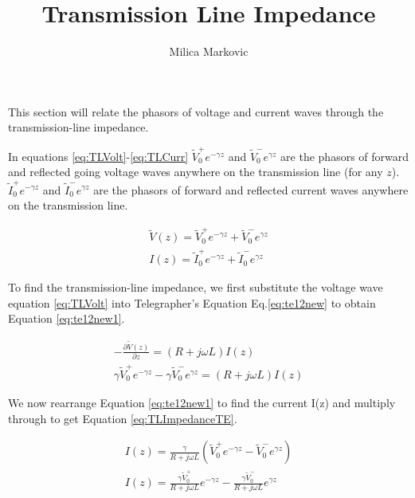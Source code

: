 \documentclass{ximera}
\title{Transmission Line Impedance}
\author{Milica Markovic}
\begin{document}
  
\begin{abstract}  

\end{abstract}  
\maketitle    






This section will relate the phasors of voltage and
current waves through the transmission-line impedance.





In equations \ref{eq:TLVolt}-\ref{eq:TLCurr} $\tilde{V}_0^+ e^{-\gamma z}$ and $\tilde{V}_0^- e^{\gamma z}$ are the phasors of forward and
reflected going voltage waves anywhere on the transmission line (for any $z$). $\tilde{I}_0^+ e^{-\gamma z}$ and $\tilde{I}_0^- e^{\gamma z}$ are the phasors of forward and
reflected current waves anywhere on the transmission line. 


\begin{eqnarray}
\tilde{V}(z)=\tilde{V}_0^+ e^{-\gamma z} + \tilde{V}_0^- e^{\gamma z}\label{eq:TLVolt} \\
I(z)=\tilde{I}_0^+ e^{-\gamma z} + \tilde{I}_0^- e^{\gamma z}\label{eq:TLCurr}
\end{eqnarray}




To find the transmission-line impedance, we first substitute the voltage wave equation \ref{eq:TLVolt} into Telegrapher's  Equation 
 Eq.\ref{eq:te12new}  to obtain Equation \ref{eq:te12new1}.




\begin{eqnarray}
-\frac{\partial \tilde{V}(z)}{\partial z} = (R+j\omega L) I(z) \label{eq:te12new} \\
\gamma \tilde{V}_0^+ e^{-\gamma z} - \gamma \tilde{V}_0^- e^{\gamma z} = (R+ j \omega
L) I(z) \label{eq:te12new1}
\end{eqnarray}

We now rearrange Equation \ref{eq:te12new1} to find the current I(z) and multiply through to get Equation \ref{eq:TLImpedanceTE}.

\begin{eqnarray}
I(z)=\frac{\gamma}{R+j\omega L} ( \tilde{V}_0^+ e^{-\gamma z} - \tilde{V}_0^-
 e^{\gamma z})  \nonumber  \\
I(z)=\frac{\gamma \tilde{V}_0^+}{R+ j \omega L} e^{-\gamma z} - \frac{\gamma \tilde{V}_0^-}{R+ j \omega L} e^{\gamma z} \label{eq:TLImpedanceTE}
\end{eqnarray}
\end{document}
